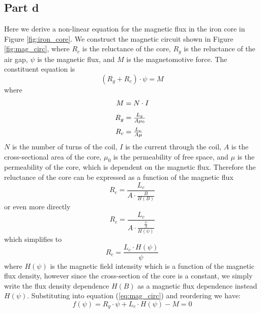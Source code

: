 \documentclass[11pt]{article}
\begin{document}
\FloatBarrier
\subsection*{Part d}
Here we derive a non-linear equation for the magnetic flux in the iron core in Figure \ref{fig:iron_core}. We construct the magnetic circuit shown in Figure \ref{fig:mag_circ}, where $R_c$ is the reluctance of the core, $R_g$ is the reluctance of the air gap, $\psi$ is the magnetic flux, and $M$ is the magnetomotive force. The constituent equation is
\begin{equation}
    \label{eq:mag_circ}
    (R_g + R_c) \cdot \psi = M
\end{equation}
where
\begin{align*}
    \begin{array}{r@{\;}l}
        M &= N \cdot I\\[0.1in]
        R_g &= \frac{L_g}{A\mu_0}\\[0.1in]
        R_c &= \frac{L_c}{A\mu}
    \end{array}
\end{align*}
$N$ is the number of turns of the coil, $I$ is the current through the coil, $A$ is the cross-sectional area of the core, $\mu_0$ is the permeability of free space, and $\mu$ is the permeability of the core, which is dependent on the magnetic flux. Therefore the reluctance of the core can be expressed as a function of the magnetic flux
$$R_c = \frac{L_c}{A \cdot \frac{B}{H(B)}}$$
or even more directly
$$R_c = \frac{L_c}{A \cdot \frac{\frac{\psi}{A}}{H(\psi)}}$$
which simplifies to
$$R_c = \frac{L_c \cdot H(\psi)}{\psi}$$
where $H(\psi)$ is the magnetic field intensity which is a function of the magnetic flux density, however since the cross-section of the core is a constant, we simply write the flux density dependence $H(B)$ as a magnetic flux dependence instead $H(\psi)$. Substituting into equation (\ref{eq:mag_circ}) and reordering we have:
$$\boxed{f(\psi) = R_g \cdot \psi + L_c \cdot H(\psi) - M = 0}$$
\end{document}
